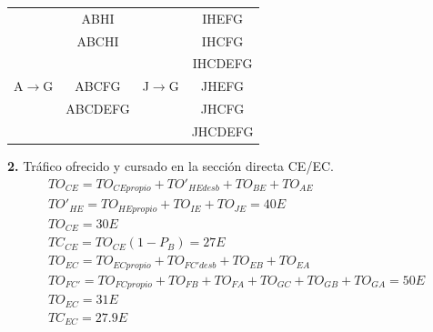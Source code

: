 \begin{exercise}[10]
\begin{center}
\begin{tabular}{c c c c}
 		& ABHI		&			& IHEFG		\\
 		& ABCHI		&			& IHCFG		\\
 		& 			&			& IHCDEFG	\\
A$\to$G & ABCFG  	& J$\to$G 	& JHEFG 	\\
 		& ABCDEFG	&			& JHCFG		\\
 		& 			&			& JHCDEFG	\\
\end{tabular}
\end{center}
\textbf{2.} Tráfico ofrecido y cursado en la sección directa CE/EC.\\
\begin{gather*}
TO_{CE}=TO_{CEpropio}+TO'_{HEdesb}+TO_{BE}+TO_{AE}\\
TO'_{HE}=TO_{HEpropio}+TO_{IE}+TO_{JE}=40E\\
TO_{CE}=30E\\
TC_{CE}=TO_{CE}(1-P_B)=27E\\
TO_{EC}=TO_{ECpropio}+TO_{FC'desb}+TO_{EB}+TO_{EA}\\
TO_{FC'}=TO_{FCpropio}+TO_{FB}+TO_{FA}+TO_{GC}+TO_{GB}+TO_{GA}=50E\\
TO_{EC}=31E\\
TC_{EC}=27.9E
\end{gather*}
\end{exercise}

